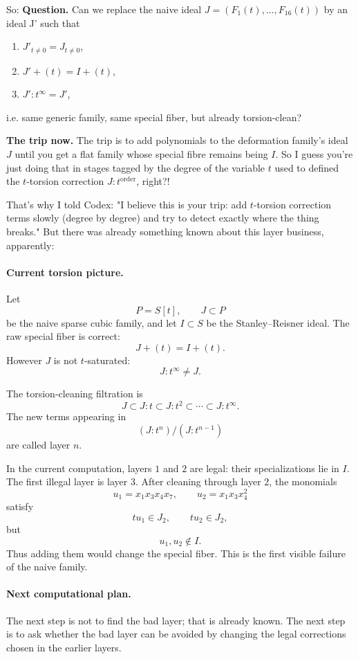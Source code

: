\medskip\noindent
So: \textbf{Question.}
Can we replace the naive ideal
$J=(F_1(t),\dots,F_{16}(t))$
by an ideal J' such that
\begin{enumerate}
\item $ J'_{t\neq 0}=J_{t\neq 0}$,
\item $J'+(t)=I+(t)$,
\item $J' : t^\infty = J'$,   
\end{enumerate}

\noindent
i.e. same generic family, same special
fiber, but already torsion-clean?

\medskip\noindent 
{\bf The trip now.}
The trip is to
add polynomials to the deformation family's
ideal $J$ until you get a flat family whose
special fibre remains being $I$. So I guess
you're just doing that in stages tagged by
the degree of the variable $t$ used to defined
the $t$-torsion correction
$J:t^{\operatorname{order}}$, right?!

That's why I told Codex: "I believe this is
your trip: add $t$-torsion correction terms
slowly (degree by degree) and try to detect
exactly where the thing breaks."
But there was already something known
about this layer business, apparently:

\paragraph{Current torsion picture.}
Let
$$
P=S[t],\qquad J\subset P
$$
be the naive sparse cubic family, and let
$I\subset S$ be the Stanley--Reisner ideal.
The raw special fiber is correct:
$$
J+(t)=I+(t).
$$
However $J$ is not $t$-saturated:
$$
J:t^\infty\neq J.
$$

The torsion-cleaning filtration is
$$
J\subset J:t\subset J:t^2
\subset\cdots\subset J:t^\infty.
$$
The new terms appearing in
$$
(J:t^n)/(J:t^{n-1})
$$
are called layer $n$.

In the current computation, layers $1$ and
$2$ are legal: their specializations lie in
$I$. The first illegal layer is layer $3$.
After cleaning through layer $2$, the
monomials
$$
u_1=x_1x_3x_4x_7,
\qquad
u_2=x_1x_3x_4^2
$$
satisfy
$$
tu_1\in J_2,\qquad tu_2\in J_2,
$$
but
$$
u_1,u_2\notin I.
$$
Thus adding them would change the special
fiber. This is the first visible failure of
the naive family.

\paragraph{Next computational plan.}
The next step is not to find the bad layer;
that is already known. The next step is to
ask whether the bad layer can be avoided by
changing the legal corrections chosen in the
earlier layers.

